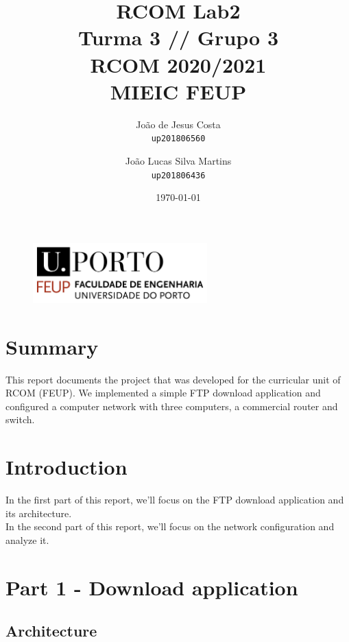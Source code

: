 \documentclass[11pt]{report}
\begin{document}
\title{\huge{\textbf{RCOM Lab2}} \\ Turma 3 // Grupo 3 \\ RCOM 2020/2021 \\ MIEIC FEUP}
\author{João de Jesus Costa \\ \texttt{up201806560} \and
	João Lucas Silva Martins \\ \texttt{up201806436}}
\date{\today{}}

\begin{figure}[b]
  \begin{center}
    \includegraphics[width=0.6\textwidth]{feup_logo.png}
  \end{center}
\end{figure}
\maketitle{}

\tableofcontents{}
\newpage

\chapter{Summary}

This report documents the project that was developed for the curricular unit
of RCOM (FEUP). We implemented a simple FTP download application and configured
a computer network with three computers, a commercial router and switch.

\chapter{Introduction}

In the first part of this report, we'll focus on the FTP download application
and its architecture.\\
In the second part of this report, we'll focus on the network configuration
and analyze it.

\chapter{Part 1 - Download application}

\section{Architecture}
\end{document}
